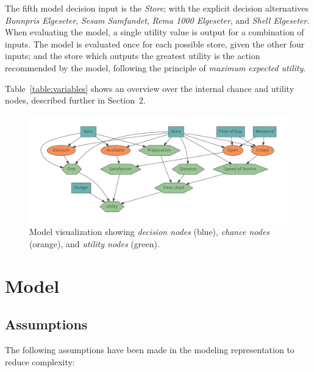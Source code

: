 The fifth model decision input is the \textit{Store}; with the explicit decision alternatives \textit{Bunnpris Elgeseter}, \textit{Sesam Samfundet}, \textit{Rema 1000 Elgeseter}, and \textit{Shell Elgeseter}. When evaluating the model, a single utility value is output for a combination of inputs. The model is evaluated once for each possible store, given the other four inputs; and the store which outputs the greatest utility is the action recommended by the model, following the principle of \textit{maximum expected utility}.

Table~\ref{table:variables} shows an overview over the internal chance and utility nodes, described further in Section~2.

\begin{figure}
\centering
\includegraphics[scale=0.45]{model}
\caption{Model visualization showing \textit{decision nodes} (blue), \textit{chance nodes} (orange), and \textit{utility nodes} (green).}
\label{fig:model}
\end{figure}

\section{Model}

\subsection{Assumptions}

The following assumptions have been made in the modeling representation to reduce complexity:

